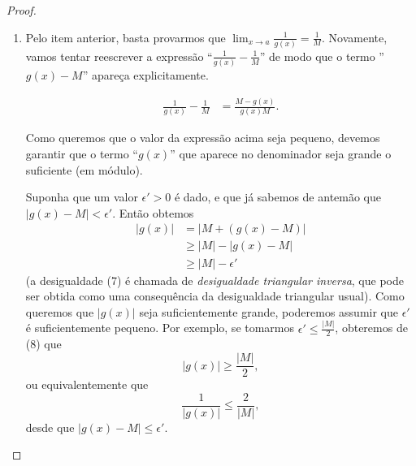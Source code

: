 \begin{proof}
\begin{enumerate}
		Novamente, tome $\delta=\min\left\{\delta_1,\delta_2\right\}$. Se $0<|x-a|<\delta$, então da Equação (3) obtemos
		\begin{align*}
			|f(x)g(x)-LM|
				&=|(f(x)-L)(g(x)-M)+L(g(x)-M)\\
				&\qquad+(f(x)-L)M|\\
				&\leq |f(x)-L|\cdot |g(x)-M|+ |L|\cdot |g(x)-M|\\
				&\qquad+|f(x)-L|\cdot |M|\\
				&<\epsilon_1\epsilon_2+|L|\epsilon_2+\epsilon_1|M|\tag{4}\\
				&\leq \epsilon_2+|L|\epsilon_2+\epsilon_1|M|\tag{5}\\
				&=(1+|L|)\epsilon_2+\epsilon_1|M|\\
				&\leq (1+|L|)\frac{\epsilon}{(|L|+1)}+\frac{\epsilon_1}{2(|M|+1)}|M|\tag{6}\\
				&<\frac{\epsilon}{2}+\frac{\epsilon}{2}\\
				&=\epsilon.
		\end{align*}
		A desigualdade (4) é estrita pois temos que $|f(x)-L|\cdot|g(x)-M|<\epsilon_1\epsilon_2$, de modo estrito (visto que $\epsilon_1$ e $\epsilon_2$ são estritamente positivos. A desigualdade (5) segue do fato que $\epsilon_1\leq 1$, e desigualdade (6) das definições de $\epsilon_1$ e $\epsilon_2$. Isto prova que $\lim_{x\to a}f(x)g(x)=LM$.
		
		\item Pelo item anterior, basta provarmos que $\lim_{x\to a}\frac{1}{g(x)}=\frac{1}{M}$. Novamente, vamos tentar reescrever a expressão ``$\frac{1}{g(x)}-\frac{1}{M}$'' de modo que o termo ''$g(x)-M$'' apareça explicitamente.
		
		\begin{align*}
			\frac{1}{g(x)}-\frac{1}{M}
				&=\frac{M-g(x)}{g(x)M}.\tag{7}
		\end{align*}
		
		Como queremos que o valor da expressão acima seja pequeno, devemos garantir que o termo ``$g(x)$'' que aparece no denominador seja grande o suficiente (em módulo).
		
		Suponha que um valor $\epsilon'>0$ é dado, e que já sabemos de antemão que $|g(x)-M|<\epsilon'$. Então obtemos
		\begin{align*}
			|g(x)|
				&=|M+(g(x)-M)|\\
				&\geq |M|-|g(x)-M|\tag{8}\\
				&\geq |M|-\epsilon'\tag{9}
		\end{align*}
		(a desigualdade (7) é chamada de \emph{desigualdade triangular inversa}, que pode ser obtida como uma consequência da desigualdade triangular usual). Como queremos que $|g(x)|$ seja suficientemente grande, poderemos assumir que $\epsilon'$ é suficientemente pequeno. Por exemplo, se tomarmos $\epsilon'\leq\frac{|M|}{2}$, obteremos de (8) que
		\[|g(x)|\geq \frac{|M|}{2},\]
		ou equivalentemente que
		\[\frac{1}{|g(x)|}\leq\frac{2}{|M|},\]
		desde que $|g(x)-M|\leq\epsilon'$.
		

\end{enumerate}
\end{proof}
